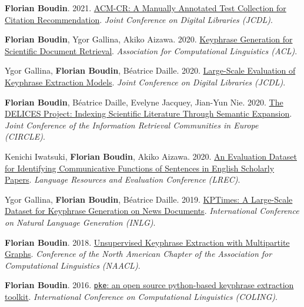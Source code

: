 \item
\textbf{Florian Boudin}.
2021.
\href{https://arxiv.org/pdf/2108.07571.pdf}{ACM-CR: A Manually Annotated Test Collection for Citation Recommendation}.
\textit{Joint Conference on Digital Libraries (JCDL)}.
\label{boudin-2021-acm}

\item
\textbf{Florian Boudin}, Ygor Gallina, Akiko Aizawa.
2020.
\href{https://aclanthology.org/2020.acl-main.105.pdf}{Keyphrase Generation for Scientific Document Retrieval}.
\textit{Association for Computational Linguistics (ACL)}.
\label{boudin-etal-2020-keyphrase}

\item
Ygor Gallina, \textbf{Florian Boudin}, Béatrice Daille.
2020.
\href{https://dl.acm.org/doi/10.1145/3383583.3398517}{Large-Scale Evaluation of Keyphrase Extraction Models}.
\textit{Joint Conference on Digital Libraries (JCDL)}.
\label{gallina-etal-2020-large}

\item
\textbf{Florian Boudin}, Béatrice Daille, Evelyne Jacquey, Jian-Yun Nie.
2020.
\href{http://ceur-ws.org/Vol-2621/CIRCLE20_27.pdf}{The DELICES Project: Indexing Scientific Literature Through Semantic Expansion}.
\textit{Joint Conference of the Information Retrieval Communities in Europe (CIRCLE)}.
\label{boudin-etal-2020-delices}

\item
Kenichi Iwatsuki, \textbf{Florian Boudin}, Akiko Aizawa.
2020.
\href{https://aclanthology.org/2020.lrec-1.212.pdf}{An Evaluation Dataset for Identifying Communicative Functions of Sentences in English Scholarly Papers}.
\textit{Language Resources and Evaluation Conference (LREC)}.
\label{iwatsuki-etal-2020-evaluation}

\item 
Ygor Gallina, \textbf{Florian Boudin}, Béatrice Daille.
2019.
\href{https://aclanthology.org/W19-8617.pdf}{KPTimes: A Large-Scale Dataset for Keyphrase Generation on News Documents}.
\textit{International Conference on Natural Language Generation (INLG)}.
\label{gallina-etal-2019-kptimes}

\item
\textbf{Florian Boudin}.
2018.
\href{https://aclanthology.org/N18-2105.pdf}{Unsupervised Keyphrase Extraction with Multipartite Graphs}.
\textit{Conference of the North American Chapter of the Association for Computational Linguistics (NAACL)}.
\label{boudin-2018-unsupervised}

\item 
\textbf{Florian Boudin}.
2016.
\href{https://aclanthology.org/C16-2015.pdf}{\texttt{pke}: an open source python-based keyphrase extraction toolkit}.
\textit{International Conference on Computational Linguistics (COLING)}.
\label{boudin-2016-pke}

